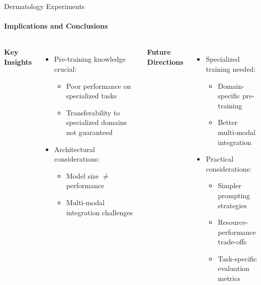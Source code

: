 \documentclass[aspectratio=169]{beamer}
\newcommand\customcolumnwidth{0.4625\textwidth}
\begin{document}
\begin{frame}{Dermatology Experiments}
\framesubtitle{Implications and Conclusions}
  \begin{columns}[T]
    \column{\customcolumnwidth}
      \textbf{Key Insights}
      \begin{itemize}
        \item Pre-training knowledge crucial:
          \begin{itemize}
            \item Poor performance on specialized tasks
            \item Transferability to specialized domains not guaranteed
          \end{itemize}
        \item Architectural considerations:
          \begin{itemize}
            \item Model size \(\neq\) performance
            \item Multi-modal integration challenges
          \end{itemize}
      \end{itemize}
    \column{\customcolumnwidth}
      \textbf{Future Directions}
      \begin{itemize}
        \item Specialized training needed:
          \begin{itemize}
            \item Domain-specific pre-training
            \item Better multi-modal integration
          \end{itemize}
        \item Practical considerations:
          \begin{itemize}
            \item Simpler prompting strategies
            \item Resource-performance trade-offs
            \item Task-specific evaluation metrics
          \end{itemize}
      \end{itemize}
  \end{columns}
\end{frame}
\end{document}
